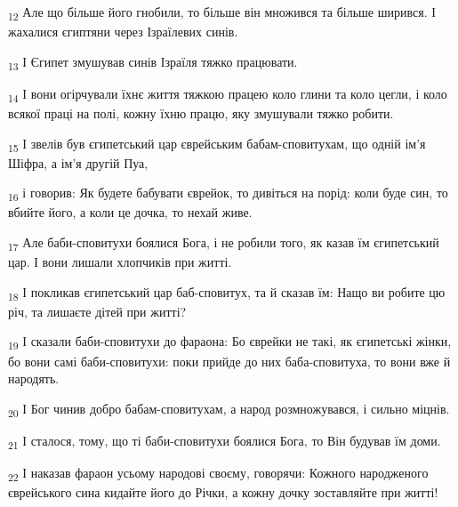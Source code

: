 \begin{tcolorbox}
\textsubscript{12} Але що більше його гнобили, то більше він множився та більше ширився. І жахалися єгиптяни через Ізраїлевих синів.
\end{tcolorbox}
\begin{tcolorbox}
\textsubscript{13} І Єгипет змушував синів Ізраїля тяжко працювати.
\end{tcolorbox}
\begin{tcolorbox}
\textsubscript{14} І вони огірчували їхнє життя тяжкою працею коло глини та коло цегли, і коло всякої праці на полі, кожну їхню працю, яку змушували тяжко робити.
\end{tcolorbox}
\begin{tcolorbox}
\textsubscript{15} І звелів був єгипетський цар єврейським бабам-сповитухам, що одній ім'я Шіфра, а ім'я другій Пуа,
\end{tcolorbox}
\begin{tcolorbox}
\textsubscript{16} і говорив: Як будете бабувати єврейок, то дивіться на порід: коли буде син, то вбийте його, а коли це дочка, то нехай живе.
\end{tcolorbox}
\begin{tcolorbox}
\textsubscript{17} Але баби-сповитухи боялися Бога, і не робили того, як казав їм єгипетський цар. І вони лишали хлопчиків при житті.
\end{tcolorbox}
\begin{tcolorbox}
\textsubscript{18} І покликав єгипетський цар баб-сповитух, та й сказав їм: Нащо ви робите цю річ, та лишаєте дітей при житті?
\end{tcolorbox}
\begin{tcolorbox}
\textsubscript{19} І сказали баби-сповитухи до фараона: Бо єврейки не такі, як єгипетські жінки, бо вони самі баби-сповитухи: поки прийде до них баба-сповитуха, то вони вже й народять.
\end{tcolorbox}
\begin{tcolorbox}
\textsubscript{20} І Бог чинив добро бабам-сповитухам, а народ розмножувався, і сильно міцнів.
\end{tcolorbox}
\begin{tcolorbox}
\textsubscript{21} І сталося, тому, що ті баби-сповитухи боялися Бога, то Він будував їм доми.
\end{tcolorbox}
\begin{tcolorbox}
\textsubscript{22} І наказав фараон усьому народові своєму, говорячи: Кожного народженого єврейського сина кидайте його до Річки, а кожну дочку зоставляйте при житті!
\end{tcolorbox}
